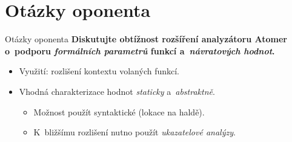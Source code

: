 \documentclass[10pt, hyperref={unicode}, aspectratio=169]{beamer}
\begin{document}
\appendix


\section{Otázky oponenta}
\begin{frame}{Otázky oponenta}
    \textbf{Diskutujte obtížnost rozšíření analyzátoru Atomer o~podporu
    \emph{formálních parametrů} funkcí a~\emph{návratových hodnot}.}
    \vspace{2em}
    \begin{itemize}\setlength\itemsep{1.5em}
        \item
            Využití: \alert{rozlišení kontextu} volaných
            funkcí.

        \item
            Vhodná charakterizace hodnot \emph{staticky}
            a~\emph{abstraktně}.

            \smallskip

            \begin{itemize}\setlength\itemsep{1em}
                \item
                    Možnost použít \alert{syntaktické
                    } (lokace na haldě).

                \item
                    K~bližšímu rozlišení nutno použít
                    \emph{ukazatelové analýzy}.
            \end{itemize}
    \end{itemize}
\end{frame}
\end{document}
